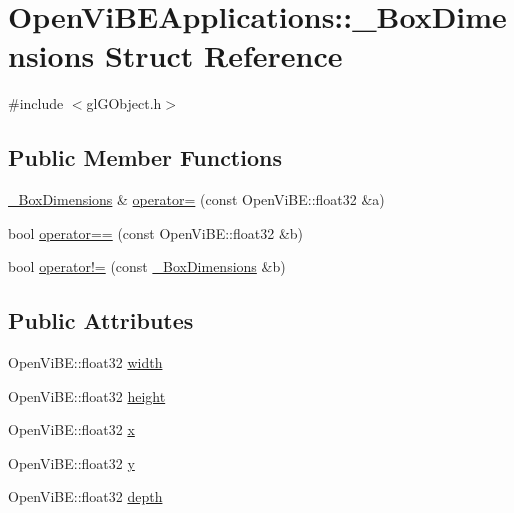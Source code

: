 \hypertarget{structOpenViBEApplications_1_1__BoxDimensions}{
\section{OpenViBEApplications::\_\-BoxDimensions Struct Reference}
\label{structOpenViBEApplications_1_1__BoxDimensions}
}


{\ttfamily \#include $<$glGObject.h$>$}

\subsection*{Public Member Functions}
\begin{DoxyCompactItemize}
\item 
\hyperlink{structOpenViBEApplications_1_1__BoxDimensions}{\_\-BoxDimensions} \& \hyperlink{structOpenViBEApplications_1_1__BoxDimensions_a70df9ca93d21fcee8d6d9fddb07ac8d8}{operator=} (const OpenViBE::float32 \&a)
\item 
bool \hyperlink{structOpenViBEApplications_1_1__BoxDimensions_aee5c6e68f9637a4346ffbe525ede6c21}{operator==} (const OpenViBE::float32 \&b)
\item 
bool \hyperlink{structOpenViBEApplications_1_1__BoxDimensions_a2e715b0b6f932def5d44c0899295ee2b}{operator!=} (const \hyperlink{structOpenViBEApplications_1_1__BoxDimensions}{\_\-BoxDimensions} \&b)
\end{DoxyCompactItemize}
\subsection*{Public Attributes}
\begin{DoxyCompactItemize}
\item 
OpenViBE::float32 \hyperlink{structOpenViBEApplications_1_1__BoxDimensions_aaabc6843a3acc12d050c53741ec40519}{width}
\item 
OpenViBE::float32 \hyperlink{structOpenViBEApplications_1_1__BoxDimensions_acb657fdcc1fba5d062656062b2530587}{height}
\item 
OpenViBE::float32 \hyperlink{structOpenViBEApplications_1_1__BoxDimensions_a14cab78068cc81ed7119b6111c6af659}{x}
\item 
OpenViBE::float32 \hyperlink{structOpenViBEApplications_1_1__BoxDimensions_a2069960def89763c418aeb503a96cbd7}{y}
\item 
OpenViBE::float32 \hyperlink{structOpenViBEApplications_1_1__BoxDimensions_a4d510f0e7b4d39533b1c624c12cb5d88}{depth}
\end{DoxyCompactItemize}



